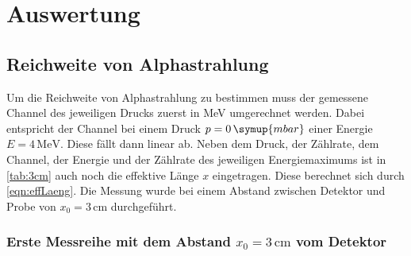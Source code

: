\section{Auswertung}
\label{sec:Auswertung}



\subsection{Reichweite von Alphastrahlung}

Um die Reichweite von Alphastrahlung zu bestimmen muss der gemessene Channel des jeweiligen Drucks zuerst in MeV umgerechnet werden. Dabei entspricht der
Channel bei einem Druck $p = 0\,\symup{mbar}$ einer Energie $E = 4 \,\unit{\MeV}$. Diese fällt dann linear ab. Neben dem Druck, der Zählrate, dem 
Channel, der Energie und der Zählrate des jeweiligen Energiemaximums ist in \autoref{tab:3cm} auch noch die effektive Länge $x$ eingetragen. Diese
berechnet sich durch \autoref{eqn:effLaeng}. Die Messung wurde bei einem Abstand zwischen Detektor und Probe von $x_0 = 3\,\unit{\cm}$ durchgeführt.
\subsubsection{Erste Messreihe mit dem Abstand $x_0= 3\, \unit{\cm}$ vom Detektor}
\label{sec:Erste Messreihe}


